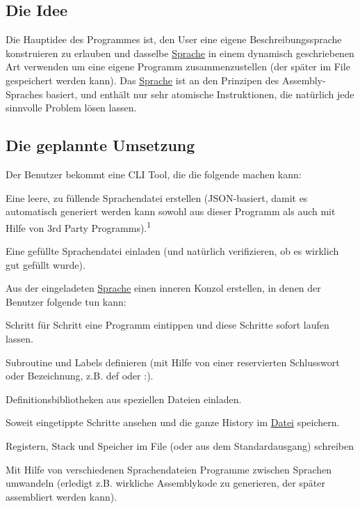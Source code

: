 \subsection*{Die Idee}

Die Hauptidee des Programmes ist, den User eine eigene Beschreibungssprache konstruieren zu erlauben und dasselbe \mbox{\hyperlink{class_sprache}{Sprache}} in einem dynamisch geschriebenen Art verwenden um eine eigene Programm zusammenzustellen (der später im File gespeichert werden kann). Das \mbox{\hyperlink{class_sprache}{Sprache}} ist an den Prinzipen des Assembly-\/\+Spraches basiert, und enthält nur sehr atomische Instruktionen, die natürlich jede sinnvolle Problem lösen lassen.

\subsection*{Die geplannte Umsetzung}

Der Benutzer bekommt eine C\+LI Tool, die die folgende machen kann\+:


\begin{DoxyEnumerate}
\item Eine leere, zu füllende Sprachendatei erstellen (J\+S\+O\+N-\/basiert, damit es automatisch generiert werden kann sowohl aus dieser Programm als auch mit Hilfe von 3rd Party Programms).\textsuperscript{1}
\item Eine gefüllte Sprachendatei einladen (und natürlich verifizieren, ob es wirklich gut gefüllt wurde).
\item Aus der eingeladeten \mbox{\hyperlink{class_sprache}{Sprache}} einen inneren Konzol erstellen, in denen der Benutzer folgende tun kann\+:
\begin{DoxyEnumerate}
\item Schritt für Schritt eine Programm eintippen und diese Schritte sofort laufen lassen.
\item Subroutine und Labels definieren (mit Hilfe von einer reservierten Schlusswort oder Bezeichnung, z.\+B. {\ttfamily def} oder {\ttfamily \+:}).
\item Definitionsbibliotheken aus speziellen Dateien einladen.
\item Soweit eingetippte Schritte ansehen und die ganze History im \mbox{\hyperlink{class_datei}{Datei}} speichern.
\item Registern, Stack und Speicher im File (oder aus dem Standardausgang) schreiben
\end{DoxyEnumerate}
\item Mit Hilfe von verschiedenen Sprachendateien Programme zwischen Sprachen umwandeln (erledigt z.\+B. wirkliche Assemblykode zu generieren, der später assembliert werden kann).
\end{DoxyEnumerate}

